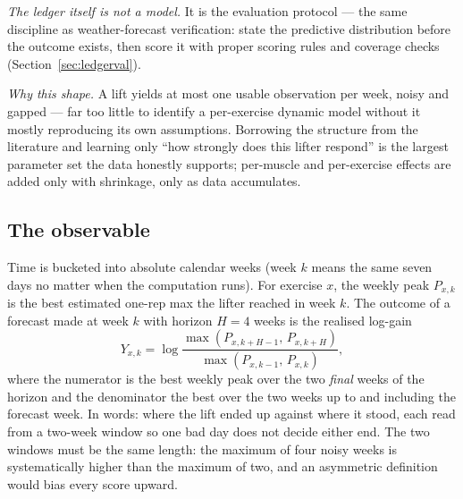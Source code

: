 \documentclass[11pt,a4paper]{article}
\begin{document}
\emph{The ledger itself is not a model.} It is the evaluation protocol --- the same discipline as weather-forecast verification: state the predictive distribution before the outcome exists, then score it with proper scoring rules and coverage checks (Section~\ref{sec:ledgerval}).

\emph{Why this shape.} A lift yields at most one usable observation per week, noisy and gapped --- far too little to identify a per-exercise dynamic model without it mostly reproducing its own assumptions. Borrowing the structure from the literature and learning only ``how strongly does this lifter respond'' is the largest parameter set the data honestly supports; per-muscle and per-exercise effects are added only with shrinkage, only as data accumulates.

\subsection{The observable}
Time is bucketed into absolute calendar weeks (week $k$ means the same seven days no matter when the computation runs). For exercise $x$, the weekly peak $P_{x,k}$ is the best estimated one-rep max the lifter reached in week $k$. The outcome of a forecast made at week $k$ with horizon $H=4$ weeks is the realised log-gain
\begin{equation}\label{eq:endpoint}
Y_{x,k}=\log\frac{\max\left(P_{x,k+H-1},\,P_{x,k+H}\right)}{\max\left(P_{x,k-1},\,P_{x,k}\right)},
\end{equation}
where the numerator is the best weekly peak over the two \emph{final} weeks of the horizon and the denominator the best over the two weeks up to and including the forecast week. In words: where the lift ended up against where it stood, each read from a two-week window so one bad day does not decide either end. The two windows must be the same length: the maximum of four noisy weeks is systematically higher than the maximum of two, and an asymmetric definition would bias every score upward.
\end{document}
